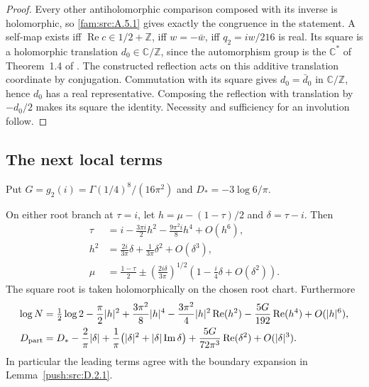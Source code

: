\begin{proof}
Every other antiholomorphic comparison composed with its inverse is
holomorphic, so \cref{fam:src:A.5.1} gives exactly the congruence in the statement.
A self-map exists iff $\operatorname{Re}c\in1/2+\mathbb Z$, iff
$w=-\bar w$, iff $q_2=iw/216$ is real. Its square is a holomorphic
translation $d_0\in\mathbb C/\mathbb Z$, since the automorphism group
is the $\mathbb C^*$ of Theorem~1.4 of
\cite{DuGuoKusakabeXie2026v1}. The constructed reflection acts on
this additive translation coordinate by conjugation. Commutation
with its square gives $d_0=\bar d_0$ in $\mathbb C/\mathbb Z$, hence
$d_0$ has a real representative. Composing the reflection with
translation by $-d_0/2$ makes its square the identity. Necessity and
sufficiency for an involution follow.
\end{proof}

\subsection{The next local terms}
Put $G=g_2(i)=\Gamma(1/4)^8/(16\pi^2)$ and
$D_*=-3\log6/\pi$.

\begin{proposition}\label{ari:C.3.1}
On either root branch at $\tau=i$, let
$h=\mu-(1-\tau)/2$ and $\delta=\tau-i$. Then
\begin{align*}
 \tau&=i-\frac{3\pi i}{2}h^2-\frac{9\pi^2i}{8}h^4+O(h^6),\\
 h^2&=\frac{2i}{3\pi}\delta+\frac1{3\pi}\delta^2+O(\delta^3),\\
 \mu&=\frac{1-\tau}{2}
  \mathbin{\pm}\left(\frac{2i\delta}{3\pi}\right)^{1/2}
          \left(1-\frac{i}{4}\delta+O(\delta^2)\right).
\end{align*}
The square root is taken holomorphically on the chosen root chart.
Furthermore
\begin{align}\label{ari:eq:cs-Li}
 \log N={}&\tfrac12\log2-\frac\pi2|h|^2
   +\frac{3\pi^2}{8}|h|^4
   -\frac{3\pi^2}{4}|h|^2\operatorname{Re}(h^2)
   -\frac{5G}{192}\operatorname{Re}(h^4)+O(|h|^6),\\
 D_{\rm part}={}&D_* -\frac2\pi|\delta|
  +\frac1\pi\bigl(|\delta|^2+|\delta|\operatorname{Im}\delta\bigr)
  +\frac{5G}{72\pi^3}\operatorname{Re}(\delta^2)
  +O(|\delta|^3).\nonumber
\end{align}
In particular the leading terms agree with the boundary expansion in Lemma~\ref{push:src:D.2.1}.
\end{proposition}

